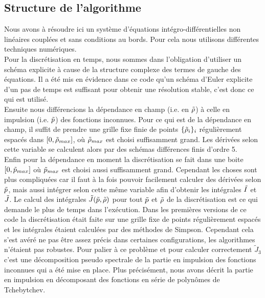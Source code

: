 \documentclass[10.5pt]{article}
\begin{document}
\begin{multicols*}{2}
\subsection{Structure de l'algorithme}

Nous avons à résoudre ici un système d'équations intégro-différentielles non linéaires couplées et sans conditions au bords. Pour cela nous utilisons différentes techniques numériques. \\

Pour la discrétisation en temps, nous sommes dans l'obligation d'utiliser un schéma explicite à cause de la structure complexe des termes de gauche des équations. Il a été mis en évidence dans ce code qu'un schéma d'Euler explicite d'un pas de temps est suffisant pour obtenir une résolution stable, c'est donc ce qui est utilisé. \\

Ensuite nous différencions la dépendance en champ (i.e. en $\tilde{\rho}$) à celle en impulsion (i.e. $\tilde{p}$) des fonctions inconnues. Pour ce qui est de la dépendance en champ, il suffit de prendre une grille fixe finie de points $\{ \tilde{\rho}_i \}_i$ régulièrement espacés dans $[0, \tilde{\rho}_{max}]$, où $\tilde{\rho}_{max}$ est choisi suffisamment grand. Les dérivées selon cette variable se calculent alors par des schémas différences finis d'ordre 5. \\

Enfin pour la dépendance en moment la discrétisation se fait dans une boite $[0, \tilde{p}_{max}]$ où $\tilde{p}_{max}$ est choisi aussi suffisamment grand. Cependant les choses sont plus compliquées car il faut à la fois pouvoir facilement calculer des dérivées selon $\tilde{p}$, mais aussi intégrer selon cette même variable afin d'obtenir les intégrales $\tilde{I}$ et $\tilde{J}$.  Le calcul des intégrales $\tilde{J}(\tilde{p}, \tilde{\rho})$ pour tout $\tilde{p}$ et $\tilde{\rho}$ de la discrétisation est ce qui demande le plus de temps dans l'exécution. Dans les premières versions de ce code la discrétisation était faite sur une grille fixe de points régulièrement espacés et les intégrales étaient calculées par des méthodes de Simpson. Cependant cela s'est avéré ne pas être assez précis dans certaines configurations, les algorithmes n'étaient pas robustes. Pour palier à ce problème et pour calculer correctement $\tilde J_3$ c'est une décomposition pseudo spectrale de la partie en impulsion des fonctions inconnues qui a été mise en place. Plus précisément, nous avons décrit la partie en impulsion en décomposant des fonctions en série de polynômes de Tchebytchev. 


\end{multicols*}
\end{document}
